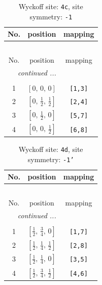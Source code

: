 \documentclass[fleqn,8pt]{jsarticle}
\begin{document}
\renewcommand{\arraystretch}{1.2}
\begin{longtable}{ccc}
\caption{Wyckoff site: {\tt 4c}, site symmetry: {\tt -1}}
 \\
 \hline \hline
No. & position & mapping \\ \hline \endfirsthead

\multicolumn{2}{l}{\tablename\ \thetable{}} \\
 \hline \hline
No. & position & mapping \\ \hline \endhead

 \hline \hline
\multicolumn{2}{r}{\footnotesize\it continued ...} \\ \endfoot

 \hline \hline
\multicolumn{2}{r}{} \\ \endlastfoot

1 & $\left[ 0,\, 0,\, 0 \right]$ & {\tt [1,3]} \\ \hline
2 & $\left[ 0,\, \frac{1}{2},\, \frac{1}{2} \right]$ & {\tt [2,4]} \\ \hline
3 & $\left[ 0,\, \frac{1}{2},\, 0 \right]$ & {\tt [5,7]} \\ \hline
4 & $\left[ 0,\, 0,\, \frac{1}{2} \right]$ & {\tt [6,8]} \\
\end{longtable}
\renewcommand{\arraystretch}{1.2}
\begin{longtable}{ccc}
\caption{Wyckoff site: {\tt 4d}, site symmetry: {\tt -1'}}
 \\
 \hline \hline
No. & position & mapping \\ \hline \endfirsthead

\multicolumn{2}{l}{\tablename\ \thetable{}} \\
 \hline \hline
No. & position & mapping \\ \hline \endhead

 \hline \hline
\multicolumn{2}{r}{\footnotesize\it continued ...} \\ \endfoot

 \hline \hline
\multicolumn{2}{r}{} \\ \endlastfoot

1 & $\left[ \frac{1}{2},\, \frac{3}{4},\, 0 \right]$ & {\tt [1,7]} \\ \hline
2 & $\left[ \frac{1}{2},\, \frac{1}{4},\, \frac{1}{2} \right]$ & {\tt [2,8]} \\ \hline
3 & $\left[ \frac{1}{2},\, \frac{1}{4},\, 0 \right]$ & {\tt [3,5]} \\ \hline
4 & $\left[ \frac{1}{2},\, \frac{3}{4},\, \frac{1}{2} \right]$ & {\tt [4,6]} \\
\end{longtable}
\end{document}
